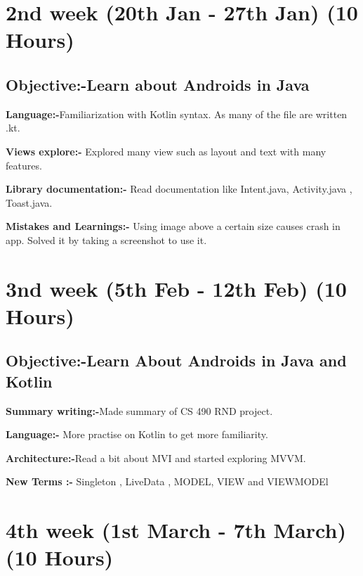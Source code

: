 \documentclass{article}
\begin{document}
\section{2nd week (20th Jan - 27th Jan) (10 Hours)}
\subsection{Objective:-Learn about Androids in Java} 
\textbf{Language:-}Familiarization with Kotlin syntax. As many of the file are written .kt.\par
\vspace{2mm}
\textbf{Views explore:-} Explored many view such as layout and text with many features.\par
\vspace{2mm}
\textbf{Library documentation:-} Read documentation like Intent.java, Activity.java , Toast.java. \par
\vspace{2mm}
\textbf{Mistakes and Learnings:-} Using image above a certain size causes crash in app. Solved it by taking a screenshot to use it.
\section{3nd week (5th Feb - 12th Feb) (10 Hours)}
\subsection{Objective:-Learn About Androids in Java and Kotlin}
\textbf{Summary writing:-}Made summary of CS 490 RND project. \par
\vspace{2mm}
\textbf{Language:- } More practise on Kotlin to get more familiarity. \par
\vspace{2mm}
\textbf{Architecture:-}Read a bit about MVI and started exploring MVVM.
\par \vspace{2mm}
\textbf{New Terms :-} Singleton , LiveData , MODEL, VIEW and VIEWMODEl
\par \vspace{2mm}

\section{4th week (1st March - 7th March) (10 Hours)}
\end{document}
